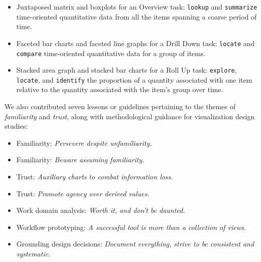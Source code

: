 \begin{itemize}
    \item Juxtaposed matrix and boxplots for an Overview task: {\tt lookup} and {\tt summarize} time-oriented quantitative data from all the items spanning a coarse period of time.
    \item Faceted bar charts and faceted line graphs for a Drill Down task: {\tt locate} and {\tt compare} time-oriented quantitative data for a group of items. 
    \item Stacked area graph and stacked bar charts for a Roll Up task: {\tt explore}, {\tt locate}, and {\tt identify} the proportion of a quantity associated with one item relative to the quantity associated with the item's group over time.
\end{itemize}

We also contributed seven lessons or guidelines pertaining to the themes of {\it familiarity} and {\it trust}, along with methodological guidance for visualization design studies:

\begin{itemize}
    \item Familiarity: {\it Persevere despite unfamiliarity.}
    \item Familiarity: {\it Beware assuming familiarity.}
    \item Trust: {\it Auxiliary charts to combat information loss.}
    \item Trust: {\it Promote agency over derived values.}
    \item Work domain analysis: {\it Worth it, and don't be daunted.}
    \item Workflow prototyping: {\it A successful tool is more than a collection of views.}
    \item Grounding design decisions: {\it Document everything, strive to be consistent and systematic.}
\end{itemize}

